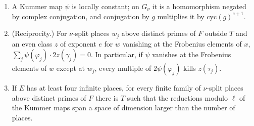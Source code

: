 \begin{proposition}\label{prop:kummer-maps}
\begin{enumerate}[label=\textup{(\alph*)}]
\item A Kummer map $\psi$ is locally constant; on $G_\nu$ it is a homomorphism negated by complex conjugation, and conjugation by $g$ multiplies it by $\mathrm{cyc}(g)^{e+1}$.
\item (Reciprocity.) For $\nu$-split places $w_j$ above distinct primes of $F$ outside $T$ and an even class $z$ of exponent $e$ for $w$ vanishing at the Frobenius elements of $x$, $\sum_j\psi(\varphi_j)\cdot2z(\gamma_j)=0$. In particular,
if $\psi$ vanishes at the Frobenius elements of $w$ except at $w_j$, every multiple of $2\psi(\varphi_j)$ kills $z(\tau_j)$.
\item If $E$ has at least four infinite places, for every finite family of $\nu$-split places above distinct primes of $F$ there is $T$ such that the reductions modulo $\ell$ of the Kummer maps span a space of dimension
larger than the number of places.
\end{enumerate}
\end{proposition}

